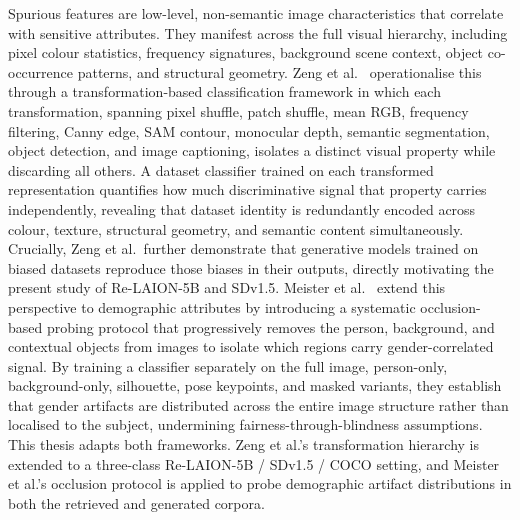 Spurious features are low-level, non-semantic image characteristics that correlate with
sensitive attributes. They manifest across the full visual hierarchy, including pixel
colour statistics, frequency signatures, background scene context, object co-occurrence
patterns, and structural geometry. Zeng et al.~\cite{Zeng_2024_UnderstandingBiasinLargeScaleVisualDatasets}
operationalise this through a transformation-based classification framework in which
each transformation, spanning pixel shuffle, patch shuffle, mean RGB, frequency
filtering, Canny edge, SAM contour, monocular depth, semantic segmentation, object
detection, and image captioning, isolates a distinct visual property while discarding
all others. A dataset classifier trained on each transformed representation quantifies
how much discriminative signal that property carries independently, revealing that
dataset identity is redundantly encoded across colour, texture, structural geometry,
and semantic content simultaneously. Crucially, Zeng et al.\ further demonstrate that
generative models trained on biased datasets reproduce those biases in their outputs,
directly motivating the present study of Re-LAION-5B and SDv1.5. Meister et
al.~\cite{Meister_2023_GenderArtifactsinVisualDatasets} extend this perspective to
demographic attributes by introducing a systematic occlusion-based probing protocol
that progressively removes the person, background, and contextual objects from images
to isolate which regions carry gender-correlated signal. By training a classifier
separately on the full image, person-only, background-only, silhouette, pose keypoints,
and masked variants, they establish that gender artifacts are distributed across the
entire image structure rather than localised to the subject, undermining
fairness-through-blindness assumptions. This thesis adapts both frameworks. Zeng et
al.'s transformation hierarchy is extended to a three-class Re-LAION-5B / SDv1.5 /
COCO setting, and Meister et al.'s occlusion protocol is applied to probe demographic
artifact distributions in both the retrieved and generated corpora.

